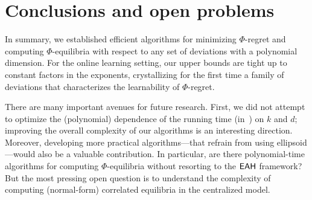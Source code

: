 \section{Conclusions and open problems}

In summary, we established efficient algorithms for minimizing $\Phi$-regret and computing $\Phi$-equilibria with respect to any set of deviations with a polynomial dimension. For the online learning setting, our upper bounds are tight up to constant factors in the exponents, crystallizing for the first time a family of deviations that characterizes the learnability of $\Phi$-regret. 

There are many important avenues for future research. First, we did not attempt to optimize the (polynomial) dependence of the running time (in~) on $k$ and $d$; improving the overall complexity of our algorithms is an interesting direction. Moreover, developing more practical algorithms---that refrain from using ellipsoid---would also be a valuable contribution. In particular, are there polynomial-time algorithms for computing $\Phi$-equilibria without resorting to the $\textsf{EAH}$ framework? But the most pressing open question is to understand the complexity of computing (normal-form) correlated equilibria in the centralized model.